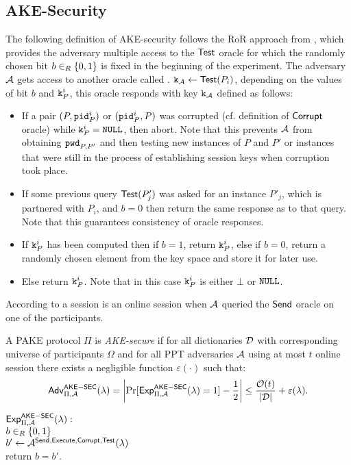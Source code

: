 \subsection{AKE-Security}\label{ssec:pake}
The following definition of \ac{AKE}-security follows the \ac{RoR} approach from \cite{Abdalla2005}, which provides the adversary multiple access to the $\mathsf{Test}$ oracle for which the randomly chosen bit $b\in_R\{0,1\}$ is fixed in the beginning of the experiment.
The adversary $\mathcal{A}$ gets access to another oracle called \Test.
$\mathtt{k}_\mathcal{A}\gets\mathsf{Test}(P_i)$, depending on the values of bit $b$ and $\mathtt{k}^i_P$, this oracle responds with key $\mathtt{k}_\mathcal{A}$ defined as follows:
\begin{itemize}
	\item If a pair $(P,\mathtt{pid}^i_P)$ or $(\mathtt{pid}^i_P, P)$ was corrupted (cf. definition of $\mathsf{Corrupt}$ oracle) while $\mathtt{k}^i_P=\mathtt{NULL}$, then abort. Note that this prevents $\mathcal{A}$ from obtaining $\mathtt{pwd}_{P,P'}$ and then testing new instances of $P$ and $P'$ or instances that were still in the process of establishing session keys when corruption took place.
	\item If some previous query $\mathsf{Test}(P'_j)$ was asked for an instance $P'_j$, which is partnered with $P_i$, and $b=0$ then return the same response as to that query. Note that this guarantees consistency of oracle responses.
	\item If $\mathtt{k}^i_P$ has been computed then if $b=1$, return $\mathtt{k}^i_P$, else if $b=0$, return a randomly chosen element from the key space and store it for later use.
	\item Else return $\mathtt{k}^i_P$. Note that in this case $\mathtt{k}^i_P$ is either $\bot$ or $\mathtt{NULL}$.
\end{itemize}
According to \cite{Abdalla2005} a session is an online session when $\mathcal{A}$ queried the $\mathsf{Send}$ oracle on one of the participants.

\begin{definition}\label{def:ake}
A \ac{PAKE} protocol $\Pi$ is \emph{\ac{AKE}-secure} if for all dictionaries $\mathcal{D}$ with corresponding universe of participants $\Omega$ and for all \ac{PPT} adversaries $\mathcal{A}$ using at most $t$ online session there exists a negligible function $\varepsilon(\cdot)$ such that:
\[\mathsf{Adv}^{\mathsf{AKE-SEC}}_{\Pi,\mathcal{A}}(\lambda)=\left|\Pr[\mathsf{Exp}_{\Pi,\mathcal{A}}^{\mathsf{AKE-SEC}}(\lambda)=1]-\frac12\right|\leq \frac{\mathcal{O}(t)}{|\mathcal{D}|}+\varepsilon(\lambda).\]

\noindent$\mathsf{Exp}_{\Pi,\mathcal{A}}^{\mathsf{AKE-SEC}}(\lambda):$ \\
\hspace*{2em} $b\in_R\{0,1\}$\\
\hspace*{2em} $b'\gets\mathcal{A}^{\mathsf{Send},\mathsf{Execute},\mathsf{Corrupt},\mathsf{Test}}(\lambda)$\\
\hspace*{2em} return $b=b'$.
\end{definition}

